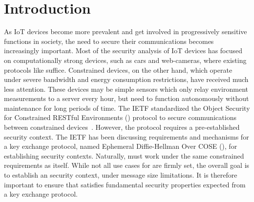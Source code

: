 \documentclass[runningheads, envcountsame, hidelinks, a4paper, draft, x11names]{llncs}
\begin{document}

\section{Introduction}
\label{sec:introduction}

As IoT devices become more prevalent and get involved in progressively sensitive
functions in society, the need to secure their communications
becomes increasingly important.
%
Most of the security analysis of IoT devices has focused on computationally
strong devices, such as cars and web-cameras, where existing protocols like
\mDandTls{} suffice.
%
Constrained devices, on the other hand, which operate under severe
bandwidth and energy consumption restrictions, have received much less
attention.
%
These devices may be simple sensors which only relay environment
measurements to a server every hour, but need to function autonomously without
maintenance for long periods of time.
%
The IETF standardized the Object Security for
Constrained RESTful Environments (\mOscore{}) protocol to secure communications
between constrained devices~\cite{rfc8613}.
%
However, the \mOscore{} protocol requires a pre-established security context.
%
The IETF has been discussing requirements and mechanisms for a key
exchange protocol, named Ephemeral Diffie-Hellman Over COSE (\mEdhoc), for
establishing \mOscore{} security contexts.
%
Naturally, \mEdhoc{} must work under the same constrained requirements as
\mOscore{} itself.
%
While not all use cases for \mEdhoc{} are firmly set, the overall goal is to
establish an \mOscore{} security context, under message size limitations.
%
It is therefore important to ensure that \mEdhoc{} satisfies fundamental
security properties expected from a key exchange protocol.
%
\end{document}
